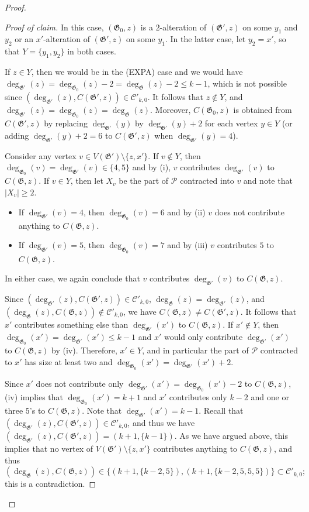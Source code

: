 \documentclass{article}
\newcommand{\PP}{\mathcal{P}}
\newcommand{\CC}{\mathcal{C}}
\newcommand\g{\mathfrak{G}}
\newenvironment{subproof}{%
  \renewcommand{\qedsymbol}{$\blacksquare$}%
  \begin{proof}[Proof of claim]%
}{%
  \end{proof}%
}
\begin{document}
\begin{proof}
\begin{subproof}
In this case, $(\g_0,z)$ is a $2$-alteration of $(\g',z)$ on some $y_1$ and $y_2$ or an $x'$-alteration of $(\g',z)$ on some $y_1$.
In the latter case, let $y_2=x'$, so that $Y=\{y_1,y_2\}$ in both cases.

If $z\in Y$, then we would be in the (EXPA) case and we would have $\deg_{\g'}(z)=\deg_{\g_0}(z)-2=\deg_{\g}(z)-2\le k-1$, which is not possible since $(\deg_{\g'}(z),C(\g',z))\in \CC'_{k,0}$.
It follows that $z\not\in Y$, and $\deg_{\g'}(z)=\deg_{\g_0}(z)=\deg_{\g}(z)$.  
Moreover, $C(\g_0,z)$ is obtained from $C(\g',z)$
by replacing $\deg_{\g'}(y)$ by $\deg_{\g'}(y)+2$ for each vertex $y\in Y$ (or adding $\deg_{\g'}(y)+2=6$
to $C(\g',z)$ when $\deg_{\g'}(y)=4$). 

Consider any vertex $v\in V(\g')\setminus \{z,x'\}$.  If $v\not\in Y$, then $\deg_{\g_0}(v)=\deg_{\g'}(v)\in\{4,5\}$
and by (i), $v$ contributes $\deg_{\g'}(v)$ to $C(\g,z)$.  If $v\in Y$, then let $X_v$ be the part of $\PP$ contracted into $v$
and note that $|X_v|\ge 2$.
\begin{itemize}
\item If $\deg_{\g'}(v)=4$, then $\deg_{\g_0}(v)=6$ and by (ii) $v$ does not contribute anything to $C(\g,z)$.
\item If $\deg_{\g'}(v)=5$, then $\deg_{\g_0}(v)=7$ and by (iii) $v$ contributes $5$ to $C(\g,z)$.
\end{itemize}
In either case, we again conclude that $v$ contributes $\deg_{\g'}(v)$ to $C(\g,z)$.

Since $(\deg_{\g'}(z),C(\g',z))\in\CC'_{k,0}$, $\deg_{\g}(z)=\deg_{\g'}(z)$, and $(\deg_{\g}(z),C(\g,z))\not\in\CC'_{k,0}$,
we have $C(\g,z)\neq C(\g',z)$.  It follows that $x'$ contributes something else than $\deg_{\g'}(x')$ to $C(\g,z)$.
If $x'\not\in Y$, then $\deg_{\g_0}(x')=\deg_{\g'}(x')\le k-1$ and $x'$ would only contribute $\deg_{\g'}(x')$ to $C(\g,z)$ by (iv).
Therefore, $x'\in Y$, and in particular the part of $\PP$ contracted to $x'$ has size at least two and $\deg_{\g_0}(x')=\deg_{\g'}(x')+2$.

Since $x'$ does not contribute only $\deg_{\g'}(x')=\deg_{\g_0}(x')-2$ to $C(\g,z)$, (iv) implies that
$\deg_{\g_0}(x')=k+1$ and $x'$ contributes only $k-2$ and one or three $5$'s to $C(\g,z)$.
Note that $\deg_{\g'}(x')=k-1$.  Recall that $(\deg_{\g'}(z),C(\g',z))\in \CC'_{k,0}$, and thus we have $(\deg_{\g'}(z),C(\g',z))=(k+1,\{k-1\})$.
As we have argued above, this implies that no vertex of $V(\g')\setminus\{z,x'\}$ contributes anything to $C(\g,z)$, and thus
$$(\deg_{\g}(z),C(\g,z))\in\{(k+1,\{k-2,5\}),(k+1,\{k-2,5,5,5\})\}\subset \CC'_{k,0};$$ this is a contradiction.
\end{subproof}


\end{proof}
\end{document}
